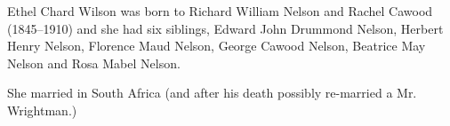 Ethel Chard Wilson was born to Richard William Nelson and Rachel Cawood (1845--1910) and she had six siblings, Edward John Drummond Nelson, Herbert Henry Nelson, Florence Maud Nelson, George Cawood Nelson, Beatrice May Nelson and Rosa Mabel Nelson.

She married  in South Africa (and after his death possibly re-married a Mr. Wrightman.)
